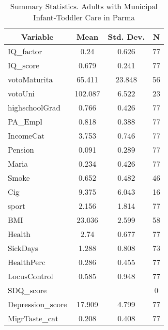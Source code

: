 
\begin{table}[htbp]\centering \caption{Summary Statistics. Adults with Municipal Infant-Toddler Care in Parma \label{bothAdultasiloMuniParma}}
\begin{tabular}{l c c  c}\hline\hline
\multicolumn{1}{c}{\textbf{Variable}} & \textbf{Mean}
 & \textbf{Std. Dev.} & \textbf{N}\\ \hline
IQ\_factor & 0.24 & 0.626  & 77\\
IQ\_score & 0.679 & 0.241  & 77\\
votoMaturita & 65.411 & 23.848  & 56\\
votoUni & 102.087 & 6.522  & 23\\
highschoolGrad & 0.766 & 0.426  & 77\\
PA\_Empl & 0.818 & 0.388  & 77\\
IncomeCat & 3.753 & 0.746  & 77\\
Pension & 0.091 & 0.289  & 77\\
Maria & 0.234 & 0.426  & 77\\
Smoke & 0.652 & 0.482  & 46\\
Cig & 9.375 & 6.043  & 16\\
sport & 2.156 & 1.814  & 77\\
BMI & 23.036 & 2.599  & 58\\
Health & 2.74 & 0.677  & 77\\
SickDays & 1.288 & 0.808  & 73\\
HealthPerc & 0.286 & 0.455  & 77\\
LocusControl & 0.585 & 0.948  & 77\\
SDQ\_score &  &   & 0\\
Depression\_score & 17.909 & 4.799  & 77\\
MigrTaste\_cat & 0.208 & 0.408  & 77\\
\hline\end{tabular}
\end{table}
